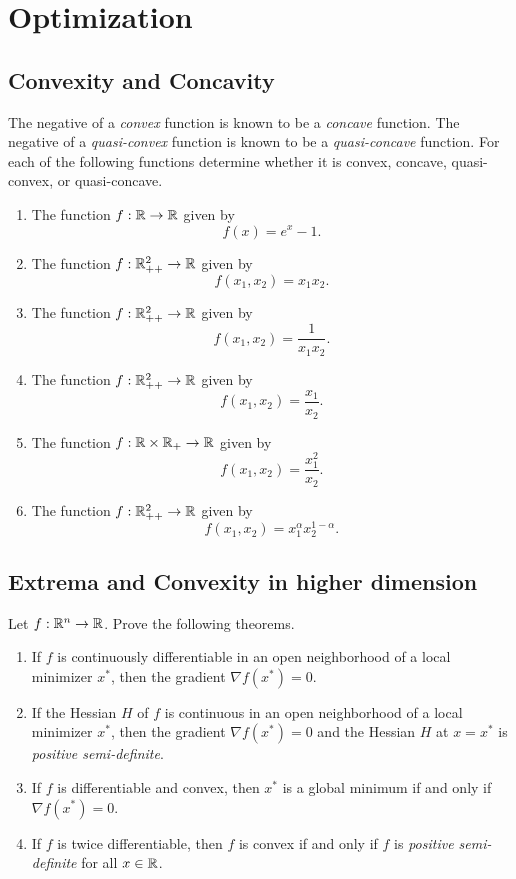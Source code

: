 \renewcommand{\chaptername}{Assignment}
\chapter{Optimization}


\section{Convexity and Concavity}
The negative of a \emph{convex} function is known to be a \emph{concave} function.
The negative of a \emph{quasi-convex} function is known to be a \emph{quasi-concave} function.
For each of the following functions determine whether it is convex, concave, quasi-convex, or quasi-concave.
\begin{enumerate}
	\item The function \(f: \mathbb{R} \to \mathbb{R}\) given by
	\[ f(x)=e^x-1. \]
	\item The function \(f: \mathbb{R}_{++}^2 \to \mathbb{R}\) given by
	\[ f(x_1,x_2)=x_1 x_2. \]
	\item The function \(f: \mathbb{R}_{++}^2 \to \mathbb{R}\) given by
	\[ f(x_1,x_2)=\frac{1}{x_1 x_2}. \]
	\item The function \(f: \mathbb{R}_{++}^2 \to \mathbb{R}\) given by
	\[ f(x_1,x_2)=\frac{x_1}{x_2}. \]
	\item The function \(f: \mathbb{R}\times\mathbb{R}_+ \to \mathbb{R}\) given by
	\[ f(x_1,x_2)=\frac{x_1^2}{x_2}. \]
	\item The function \(f: \mathbb{R}_{++}^2 \to \mathbb{R}\) given by
	\[ f(x_1,x_2)=x_1^\alpha x_2^{1-\alpha}. \]
\end{enumerate}


\section{Extrema and Convexity in higher dimension}
Let \(f: \mathbb{R}^n \to \mathbb{R}\). Prove the following theorems.
\begin{enumerate}
	\item If \(f\) is continuously differentiable in an open neighborhood of a local minimizer \(x^*\), then the gradient \(\nabla f(x^ *) = 0\).
	\item If the Hessian \(H\) of \(f\) is continuous in an open neighborhood of a local minimizer \(x^*\), then the gradient \(\nabla f(x^ *) = 0\) and the Hessian \(H\) at \(x=x^*\) is \emph{positive semi-definite}.
	\item If \(f\) is differentiable and convex, then \(x^*\) is a global minimum if and only if \(\nabla f(x^*) = 0\).
	\item If \(f\) is twice differentiable, then \(f\) is convex if and only if \(f\) is \emph{positive semi-definite} for all \(x \in \mathbb{R}\).
\end{enumerate}


